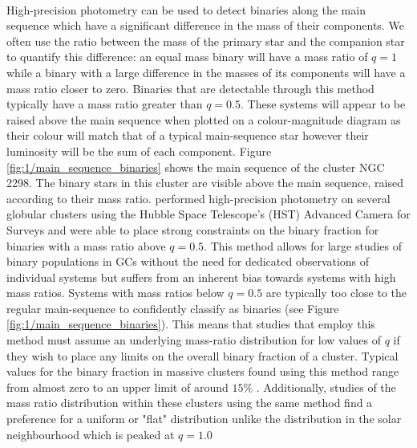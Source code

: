 \paragraph{}
High-precision photometry can be used to detect binaries along the main sequence which have a
significant difference in the mass of their components. We often use the ratio between the mass of
the primary star and the companion star to quantify this difference: an equal mass binary will have
a mass ratio of $q=1$ while a binary with a large difference in the masses of its components will
have a mass ratio closer to zero. Binaries that are detectable through this method typically have a
mass ratio greater than $q=0.5$. These systems will appear to be raised above the main sequence when
plotted on a colour-magnitude diagram as their colour will match that of a typical main-sequence
star however their luminosity will be the sum of each component. Figure
\ref{fig:1/main_sequence_binaries} shows the main sequence of the cluster NGC\,2298. The binary
stars in this cluster are visible above the main sequence, raised according to their mass ratio.
\citet{Milone2012} performed high-precision photometry on several globular clusters using the Hubble
Space Telescope's (HST) Advanced Camera for Surveys and were able to place strong constraints on the
binary fraction for binaries with a mass ratio above $q=0.5$. This method allows for large studies
of binary populations in GCs without the need for dedicated observations of individual systems but
suffers from an inherent bias towards systems with high mass ratios. Systems with mass ratios below
$q=0.5$ are typically too close to the regular main-sequence to confidently classify as binaries
(see Figure \ref{fig:1/main_sequence_binaries}). This means that studies that employ this method
must assume an underlying mass-ratio distribution for low values of $q$ if they wish to place any
limits on the overall binary fraction of a cluster. Typical values for the binary fraction in
massive clusters found using this method range from almost zero to an upper limit of around $15\%$
\citep{Milone2012}. Additionally, studies of the mass ratio distribution within these clusters using
the same method find a preference for a uniform or "flat" distribution unlike the distribution in
the solar neighbourhood which is peaked at $q=1.0$ \citep{Milone2012,Fisher2005}


